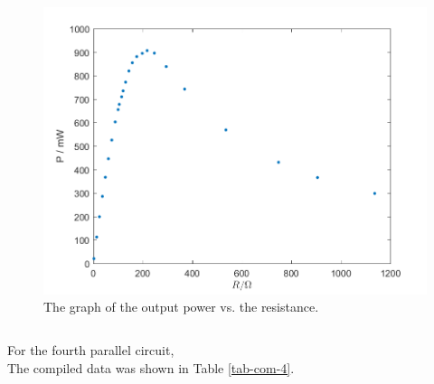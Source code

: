 \begin{figure}[H]
\centering
\includegraphics[scale=0.6]{PR3.png}
\caption{The graph of the output power vs. the resistance.}
\label{PR-3}
\end{figure}
$$$$

For the fourth parallel circuit,\\

The compiled data was shown in Table \ref{tab-com-4}.\\

